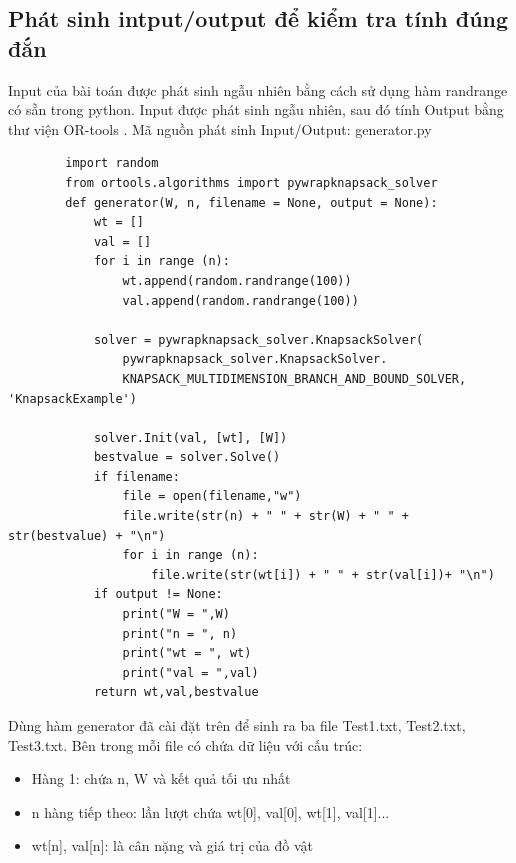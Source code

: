 \documentclass[12pt,a4paper]{report}
\begin{document}
    \subsection{Phát sinh intput/output để kiểm tra tính đúng đắn}
    Input của bài toán được phát sinh ngẫu nhiên bằng cách sử dụng hàm randrange có
    sẵn trong python. Input được phát sinh ngẫu nhiên, sau đó tính Output bằng 
    thư viện OR-tools . Mã nguồn phát sinh Input/Output:
    generator.py
    \begin{lstlisting}
        import random
        from ortools.algorithms import pywrapknapsack_solver   
        def generator(W, n, filename = None, output = None):
            wt = []
            val = []
            for i in range (n):
                wt.append(random.randrange(100))
                val.append(random.randrange(100))
        
            solver = pywrapknapsack_solver.KnapsackSolver(
                pywrapknapsack_solver.KnapsackSolver.
                KNAPSACK_MULTIDIMENSION_BRANCH_AND_BOUND_SOLVER, 'KnapsackExample')
        
            solver.Init(val, [wt], [W])
            bestvalue = solver.Solve()
            if filename:
                file = open(filename,"w")
                file.write(str(n) + " " + str(W) + " " + str(bestvalue) + "\n")
                for i in range (n):
                    file.write(str(wt[i]) + " " + str(val[i])+ "\n")
            if output != None:
                print("W = ",W)
                print("n = ", n)
                print("wt = ", wt)
                print("val = ",val)
            return wt,val,bestvalue
    \end{lstlisting}
    Dùng hàm generator đã cài đặt trên để sinh ra ba file Test1.txt, Test2.txt,
    Test3.txt. Bên trong mỗi file có chứa dữ liệu với cấu trúc:
    \begin{itemize}
        \item Hàng 1: chứa n, W và kết quả tối ưu nhất
        \item n hàng tiếp theo: lần lượt chứa wt[0], val[0], wt[1], val[1]... 
        \item wt[n], val[n]: là cân nặng và giá trị của đồ vật
    \end{itemize}
\end{document}
